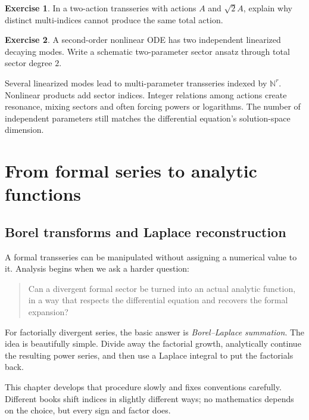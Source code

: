 \documentclass[11pt,openany]{book}
\theoremstyle{definition}
\newtheorem{exercise}{Exercise}[chapter]
\theoremstyle{plain}
\theoremstyle{remark}
\newcommand{\N}{\mathbb{N}}
\begin{document}
\begin{exercise}
In a two-action transseries with actions $A$ and $\sqrt2A$, explain why distinct multi-indices cannot produce the same total action.
\end{exercise}

\begin{exercise}
A second-order nonlinear ODE has two independent linearized decaying modes. Write a schematic two-parameter sector ansatz through total sector degree $2$.
\end{exercise}

\begin{summarybox}
Several linearized modes lead to multi-parameter transseries indexed by $\N^r$. Nonlinear products add sector indices. Integer relations among actions create resonance, mixing sectors and often forcing powers or logarithms. The number of independent parameters still matches the differential equation's solution-space dimension.
\end{summarybox}

\part{From formal series to analytic functions}

\chapter{Borel transforms and Laplace reconstruction}\label{ch:borel}

A formal transseries can be manipulated without assigning a numerical value to it. Analysis begins when we ask a harder question:

\begin{quote}
Can a divergent formal sector be turned into an actual analytic function, in a way that respects the differential equation and recovers the formal expansion?
\end{quote}

For factorially divergent series, the basic answer is \emph{Borel--Laplace summation}. The idea is beautifully simple. Divide away the factorial growth, analytically continue the resulting power series, and then use a Laplace integral to put the factorials back.

This chapter develops that procedure slowly and fixes conventions carefully. Different books shift indices in slightly different ways; no mathematics depends on the choice, but every sign and factor does.
\end{document}

